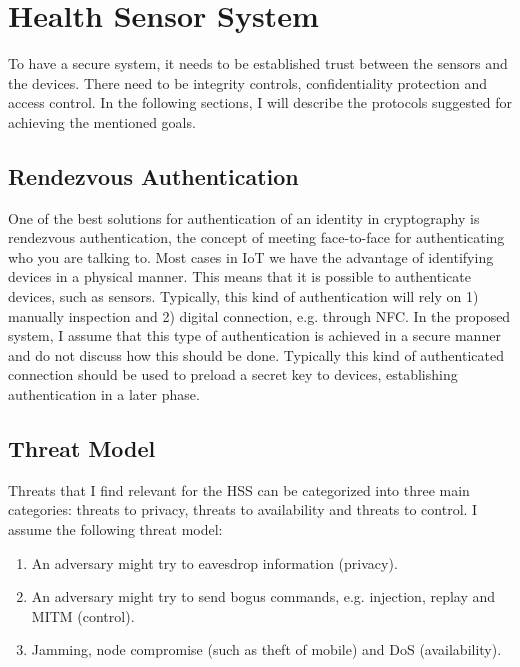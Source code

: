 \section{Health Sensor System}\label{hss}
To have a secure system, it needs to be established trust between the sensors and the devices.
There need to be integrity controls, confidentiality protection and access control. 
In the following sections, I will describe the protocols suggested for achieving the mentioned goals.

\subsection{Rendezvous Authentication}\label{rendezvous_authentication}
One of the best solutions for authentication of an identity in cryptography is rendezvous authentication, the concept of meeting face-to-face for authenticating who you are talking to. 
Most cases in \gls{IoT} we have the advantage of identifying devices in a physical manner.
This means that it is possible to authenticate devices, such as sensors. 
Typically, this kind of authentication will rely on 1) manually inspection and 2) digital connection, e.g. through \gls{NFC}.
In the proposed system, I assume that this type of authentication is achieved in a secure manner and do not discuss how this should be done.
Typically this kind of authenticated connection should be used to preload a secret key to devices, establishing authentication in a later phase.

\subsection{Threat Model}
Threats that I find relevant for the \gls{HSS} can be categorized into three main categories: threats to privacy, threats to availability and threats to control.
I assume the following threat model:
\begin{enumerate}
  \item An adversary might try to eavesdrop information (privacy).
  \item An adversary might try to send bogus commands, e.g. injection, replay and \gls{MITM} (control).
  \item Jamming, node compromise (such as theft of mobile) and \gls{DoS} (availability).
\end{enumerate}

